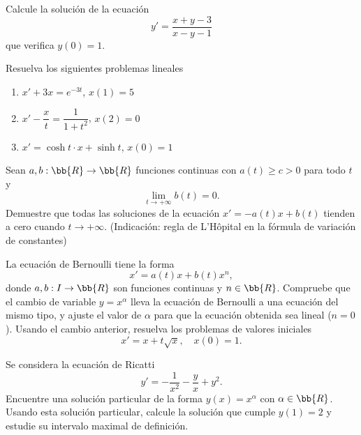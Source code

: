 \begin{ejercicio}
    Calcule la solución de la ecuación
    \begin{equation*}
        y' = \dfrac{x + y - 3}{x - y - 1}
    \end{equation*}
    que verifica $y(0) = 1$.
\end{ejercicio}

\begin{ejercicio}
    Resuelva los siguientes problemas lineales
    \begin{enumerate}
        \item $x' + 3x = e^{-3t}$, $x(1) = 5$
        \item $x' - \dfrac{x}{t} = \dfrac{1}{1+t^2}$, $x(2) = 0$
        \item $x' = \cosh t \cdot x + \sinh t$, $x(0) = 1$
    \end{enumerate}
\end{ejercicio}

\begin{ejercicio}
    Sean $a, b : \bb{R} \to \bb{R}$ funciones continuas con $a(t) \geq c > 0$ para todo $t$ y
    \begin{equation*}
        \lim_{t \to +\infty} b(t) = 0.
    \end{equation*}
    Demuestre que todas las soluciones de la ecuación $x' = -a(t)x + b(t)$ tienden a cero cuando $t \to +\infty$. (Indicación: regla de L'Hôpital en la fórmula de variación de constantes)
\end{ejercicio}

\begin{ejercicio}
    La ecuación de Bernoulli tiene la forma
    \begin{equation*}
        x' = a(t)x + b(t)x^n,
    \end{equation*}
    donde $a, b : I \to \bb{R}$ son funciones continuas y $n \in \bb{R}$. Compruebe que el cambio de variable $y = x^\alpha$ lleva la ecuación de Bernoulli a una ecuación del mismo tipo, y ajuste el valor de $\alpha$ para que la ecuación obtenida sea lineal ($n = 0$). Usando el cambio anterior, resuelva los problemas de valores iniciales
    \begin{equation*}
        x' = x + t\sqrt{x}, \quad x(0) = 1.
    \end{equation*}
\end{ejercicio}

\begin{ejercicio}
    Se considera la ecuación de Ricatti
    \begin{equation*}
        y' = -\dfrac{1}{x^2} - \dfrac{y}{x} + y^2.
    \end{equation*}
    Encuentre una solución particular de la forma $y(x) = x^\alpha$ con $\alpha \in \bb{R}$. Usando esta solución particular, calcule la solución que cumple $y(1) = 2$ y estudie su intervalo maximal de definición.
\end{ejercicio}

